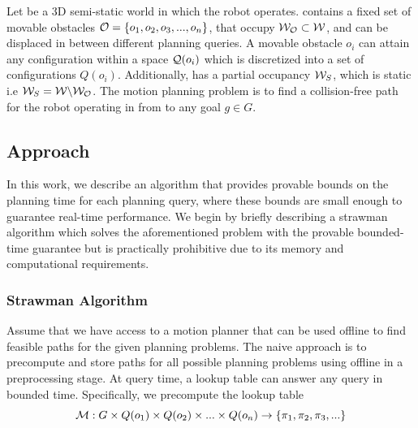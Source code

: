 \documentclass[a4paper]{report}
\begin{document}
Let \calW be a 3D semi-static world in which the robot operates. \calW contains a fixed set of movable obstacles $\mathcal{O} = \{o_1, o_2, o_3,...,o_n\}$, that occupy $\mathcal{W}_\mathcal{O} \subset \mathcal{W}$, and can be displaced in between different planning queries. A movable obstacle $o_i$ can attain any configuration within a space $\mathcal{Q}(o_i)$ which is discretized into a set of configurations $Q(o_i)$. Additionally, \calW has a partial occupancy $\mathcal{W}_S$, which is static i.e $\mathcal{W}_S = \mathcal{W} \backslash \mathcal{W}_\mathcal{O}$. The motion planning problem is to find a collision-free path for the robot operating in \calW from \Sstart to any goal $g \in G$.


\subsection{Approach}
In this work, we describe an algorithm that provides provable bounds on the planning time for each planning query, where these bounds are small enough to guarantee real-time performance.
We begin by briefly describing a strawman algorithm which solves the aforementioned problem with the provable bounded-time guarantee but is practically prohibitive due to its memory and computational requirements.


\subsubsection{Strawman Algorithm}
Assume that we have access to a motion planner \calP that can be used offline to find feasible paths for the given planning problems. The naive approach
is to precompute and store paths for all possible planning problems using \calP %
offline in a preprocessing stage.
At query time, a lookup table can answer any query in bounded time. Specifically, we precompute the lookup table
$$
\mathcal{M} : G \times Q(o_1) \times Q(o_2) \times ... \times Q(o_n) \rightarrow \{\pi_1, \pi_2,\pi_3,...\}
$$
\end{document}
